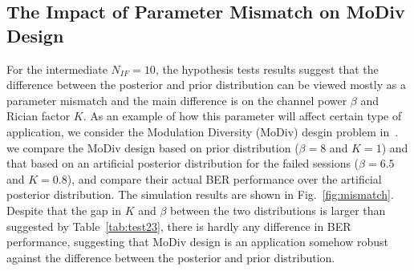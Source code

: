 \documentclass[journal,draftcls,onecolumn,12pt,twoside]{IEEEtran}
\begin{document}
\subsection{The Impact of Parameter Mismatch on MoDiv Design}
For the intermediate $N_{IF} = 10$, the hypothesis tests results suggest that
the difference between the posterior and prior distribution can be viewed
mostly as a parameter mismatch and the main difference is on the channel power
$\beta$ and Rician factor $K$. As an example of how this parameter will affect
certain type of application, we consider the Modulation Diversity (MoDiv) desgin
problem in~\cite{wu2015modulation}\cite{harvind2005symbol}. we compare the
MoDiv design based on prior distribution ($\beta = 8$ and $K = 1$) and that
based on an artificial posterior distribution for the failed sessions ($\beta =
6.5$ and $K = 0.8$), and compare their actual BER performance over the
artificial posterior distribution.
The simulation results are shown in Fig.~\ref{fig:mismatch}.
Despite that the gap in $K$ and $\beta$ between the two distributions is larger
than suggested by Table~\ref{tab:test23}, there is hardly any difference in BER
performance, suggesting that MoDiv design is an application somehow robust
against the difference between the posterior and prior distribution.
\end{document}
